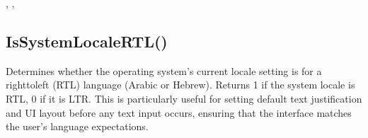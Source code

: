 \documentclass[letterpaper,10pt,english]{sphinxmanual}
\begin{document}
\sphinxAtStartPar
{}

\sphinxAtStartPar
{}, , 

\ignorespaces 

\subsection{IsSystemLocaleRTL()}
\label{\detokenize{reference/peblstring:issystemlocalertl}}\label{\detokenize{reference/peblstring:index-13}}
\sphinxAtStartPar
{}

\sphinxAtStartPar
{}

\sphinxAtStartPar
Determines whether the operating system’s current locale setting is for a right\sphinxhyphen{}to\sphinxhyphen{}left (RTL) language (Arabic or Hebrew). Returns 1 if the system locale is RTL, 0 if it is LTR. This is particularly useful for setting default text justification and UI layout before any text input occurs, ensuring that the interface matches the user’s language expectations.

\sphinxAtStartPar
{}

\begin{sphinxVerbatim}[commandchars=\\\{\}]
\end{sphinxVerbatim}

\sphinxAtStartPar
{}
\end{document}

